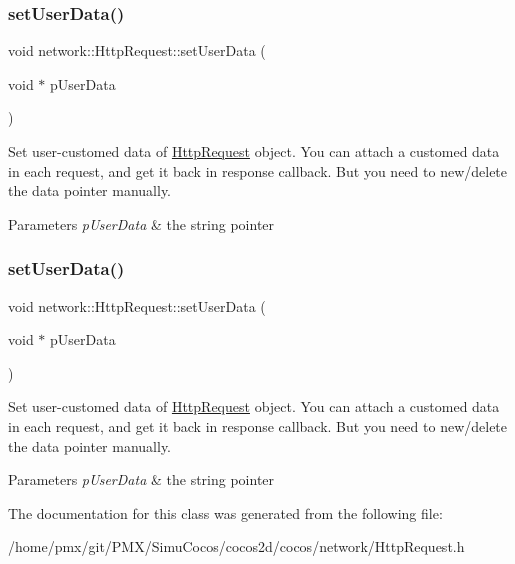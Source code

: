 \subsubsection{\texorpdfstring{set\+User\+Data()}{setUserData()}\hspace{0.1cm}{\footnotesize\ttfamily [1/2]}}
{\footnotesize\ttfamily void network\+::\+Http\+Request\+::set\+User\+Data (\begin{DoxyParamCaption}\item[{void $\ast$}]{p\+User\+Data }\end{DoxyParamCaption})\hspace{0.3cm}{\ttfamily [inline]}}

Set user-\/customed data of \hyperlink{classnetwork_1_1HttpRequest}{Http\+Request} object. You can attach a customed data in each request, and get it back in response callback. But you need to new/delete the data pointer manually.


\begin{DoxyParams}{Parameters}
{\em p\+User\+Data} & the string pointer \\
\hline
\end{DoxyParams}
\mbox{\label{classnetwork_1_1HttpRequest_a7afec412b6f1fb5ab420212f7889313d}} 
\subsubsection{\texorpdfstring{set\+User\+Data()}{setUserData()}\hspace{0.1cm}{\footnotesize\ttfamily [2/2]}}
{\footnotesize\ttfamily void network\+::\+Http\+Request\+::set\+User\+Data (\begin{DoxyParamCaption}\item[{void $\ast$}]{p\+User\+Data }\end{DoxyParamCaption})\hspace{0.3cm}{\ttfamily [inline]}}

Set user-\/customed data of \hyperlink{classnetwork_1_1HttpRequest}{Http\+Request} object. You can attach a customed data in each request, and get it back in response callback. But you need to new/delete the data pointer manually.


\begin{DoxyParams}{Parameters}
{\em p\+User\+Data} & the string pointer \\
\hline
\end{DoxyParams}


The documentation for this class was generated from the following file\+:\begin{DoxyCompactItemize}
\item 
/home/pmx/git/\+P\+M\+X/\+Simu\+Cocos/cocos2d/cocos/network/Http\+Request.\+h\end{DoxyCompactItemize}
